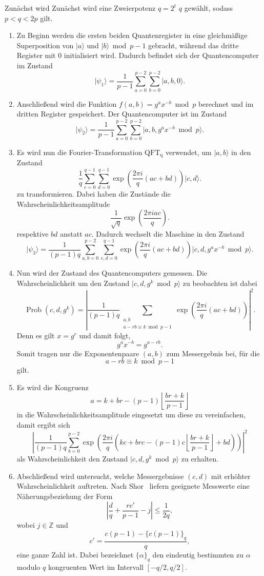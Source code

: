 Zunächst wird Zunächst wird eine Zweierpotenz $q=2^t$ $q$ gewählt,
sodass $p<q<2p$ gilt.
\begin{enumerate}
    \item Zu Beginn werden die ersten beiden Quantenregister in eine gleichmäßige Superposition von $\lvert a \rangle$ und $\lvert b \rangle \bmod p-1$ gebracht, während das dritte Register mit $0$ initialisiert wird. Dadurch befindet sich der Quantencomputer im Zustand
    \[
    \lvert \psi_1\rangle = \frac{1}{p-1}\sum_{a=0}^{p-2}\sum_{b=0}^{p-2}\lvert a,b,0\rangle.
    \]
    \item Anschließend wird die Funktion \(f(a,b)=g^a x^{-b}\bmod p\) berechnet und im dritten Register gespeichert. Der Quantencomputer ist im Zustand
    \[
    \lvert\psi_2\rangle=\frac{1}{p-1}\sum_{a=0}^{p-2}\sum_{b=0}^{p-2}\lvert a,b,g^a x^{-b}\bmod p\rangle.
    \]
    \item Es wird nun die Fourier-Transformation $\operatorname{QFT_q}$ verwendet, um $\lvert a,b \rangle$ in den Zustand  
    \[
    \frac{1}{q}
    \sum_{c=0}^{q-1}\sum_{d=0}^{q-1}
    \exp\left(\frac{2\pi i}{q}(ac+bd)\right)|c,d\rangle.
    \]
    zu transformieren. Dabei haben die Zustände die Wahrscheinlichkeitsamplitude
    \[
    \frac{1}{\sqrt{q}}\exp(\frac{2\pi i ac}{q}).
    \]
    respektive $bd$ anstatt $ac$. Dadurch wechselt die Maschine in den Zustand
    \[
    \lvert\psi_3\rangle=\frac{1}{(p-1)q}\sum_{a,b=0}^{p-2}\sum_{c,d=0}^{q-1}\exp\left(\frac{2\pi i}{q}(ac+bd)\right)\lvert c,d,g^a x^{-b}\bmod p\rangle.
    \]
    \item Nun wird der Zustand des Quantencomputers gemessen. Die Wahrscheinlichkeit um den Zustand $\lvert c,d,g^k\bmod p\rangle$ zu beobachten ist dabei 
    \[
    \operatorname{Prob}(c,d,g^k)=
    \left|
    \frac{1}{(p-1)q}
    \sum_{\substack{a,b\\
    a-rb\equiv k \bmod p-1}}
    \exp\left(
    \frac{2\pi i}{q}(ac+bd)
    \right)
    \right|^2.
    \]
    Denn es gilt $x=g^r$ und damit folgt,
    \[
    g^a x^{-b}=g^{a-rb}.
    \]
    Somit tragen nur die Exponentenpaare $(a,b)$ zum Messergebnis bei, für die
    \[
    a-rb\equiv k \bmod p-1
    \]
    gilt.
    \item Es wird die Kongruenz 
    \[
    a = k+br -(p-1)\left\lfloor\frac{br+k}{p-1}\right\rfloor
    \]
    in die Wahrscheinlichkeitsamplitude eingesetzt um diese zu vereinfachen, damit ergibt sich
    \[
    \left|\frac{1}{(p-1)q}\sum_{b=0}^{p-2}\exp\left(\frac{2\pi i}{q}\left(kc+brc-(p-1)c\left\lfloor\frac{br+k}{p-1}\right\rfloor+bd\right)\right)\right|^2
    \]
    als Wahrscheinlichkeit den Zustand $\lvert c,d, g^k\bmod p\rangle$ zu erhalten.
    \item Abschließend wird untersucht, welche
    Messergebnisse $(c,d)$ mit erhöhter Wahrscheinlichkeit auftreten. Nach Shor~\cite[S.~20--21]{shor97} liefern geeignete Messwerte eine Näherungsbeziehung der Form
    \[
    \left|
    \frac{d}{q}+\frac{rc'}{p-1}-j
    \right|
    \leq\frac{1}{2q},
    \]
    wobei $j\in\mathbb{Z}$ und
    \[
    c'=\frac{c(p-1)-{\{c(p-1)\}}_q}{q},
    \]
    eine ganze Zahl ist. Dabei bezeichnet ${\{\alpha\}}_q$ den eindeutig bestimmten zu $\alpha$ modulo $q$ kongruenten Wert im Intervall
$[-q/2,q/2]$.


\end{enumerate}
